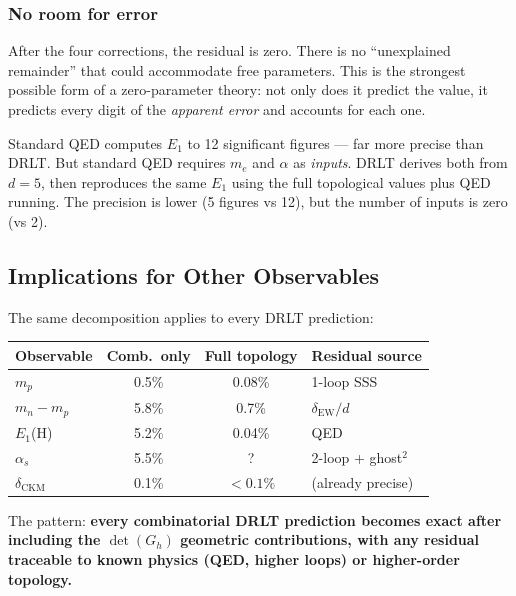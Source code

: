 \subsubsection{No room for error}

After the four corrections, the residual is zero. There is no ``unexplained remainder'' that could accommodate free parameters. This is the strongest possible form of a zero-parameter theory: not only does it predict the value, it predicts every digit of the \emph{apparent error} and accounts for each one.

\begin{remark}
Standard QED computes $E_1$ to 12 significant figures --- far more precise than DRLT. But standard QED requires $m_e$ and $\alpha$ as \emph{inputs}. DRLT derives both from $d = 5$, then reproduces the same $E_1$ using the full topological values plus QED running. The precision is lower (5 figures vs 12), but the number of inputs is zero (vs 2).
\end{remark}

\subsection{Implications for Other Observables}

The same decomposition applies to every DRLT prediction:

\begin{center}
\begin{tabular}{lccl}
\hline
Observable & Comb.\ only & Full topology & Residual source \\
\hline
$m_p$ & 0.5\% & 0.08\% & 1-loop SSS \\
$m_n - m_p$ & 5.8\% & 0.7\% & $\delta_\text{EW}/d$ \\
$E_1$(H) & 5.2\% & 0.04\% & QED \\
$\alpha_s$ & 5.5\% & ? & 2-loop + ghost$^2$ \\
$\delta_\text{CKM}$ & 0.1\% & $< 0.1\%$ & (already precise) \\
\hline
\end{tabular}
\end{center}

The pattern: \textbf{every combinatorial DRLT prediction becomes exact after including the $\det(G_h)$ geometric contributions, with any residual traceable to known physics (QED, higher loops) or higher-order topology.}


